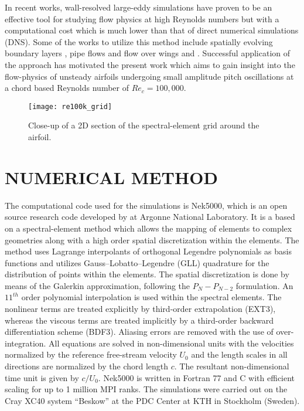 \documentclass[twocolumn,10pt]{tsfp}
\begin{document}
In recent works, wall-resolved large-eddy simulations have proven to be an effective tool for studying flow physics at high Reynolds numbers but with a computational cost which is much lower than that of direct numerical simulations (DNS). Some of the works to utilize this method include spatially evolving boundary layers \citep{eitel14}, pipe flows \citep{chin15} and flow over wings \citep{uzun10} and \citep{lombard15}. Successful application of the approach has motivated the present work which aims to gain insight into the flow-physics of unsteady airfoils undergoing small amplitude pitch oscillations at a chord based Reynolds number of $Re_{c}=100,000$.
\begin{figure}[t]
	\centering
	\texttt{[image: re100k\_grid]}
	\caption{Close-up of a 2D section of the spectral-element grid around the airfoil.}
	\label{fig:re100k_grid}
\end{figure}

\section*{NUMERICAL METHOD}

The computational code used for the simulations is Nek5000, which is an open source research code developed by \cite{nek5000} at Argonne National Laboratory. It is a based on a spectral-element method which allows the mapping of elements to complex geometries along with a high order spatial discretization within the elements. The method uses Lagrange interpolants of orthogonal Legendre polynomials as basis functions and utilizes Gauss--Lobatto--Legendre (GLL) quadrature for the distribution of points within the elements. The spatial discretization is done by means of the Galerkin approximation, following the $P_{N}-P_{N-2}$ formulation. An $11^{th}$ order polynomial interpolation is used within the spectral elements. The nonlinear terms are treated explicitly by third-order extrapolation (EXT3), whereas the viscous terms are treated implicitly by a third-order backward differentiation scheme (BDF3). Aliasing errors are removed with the use of over-integration. All equations are solved in non-dimensional units with the velocities normalized by the reference free-stream velocity $U_{0}$ and the length scales in all directions are normalized by the chord length $c$. The resultant non-dimensional time unit is given by $c/U_{0}$. Nek5000 is written in Fortran 77 and C with efficient scaling for up to 1 million MPI ranks. The simulations were carried out on the Cray XC40 system “Beskow” at the PDC Center at KTH in Stockholm (Sweden).
\end{document}
